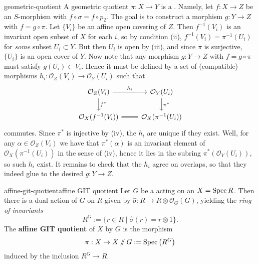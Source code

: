 \begin{example}{geometric-quotient}
    A geometric quotient $\pi : X \to Y$ is a . Namely, let $f : X \to Z$ be an $S$-morphism with $f \circ \sigma = f \circ p_2$. The goal is to construct a morphism $g : Y \to Z$ with $f = g \circ \pi$. Let $\{ V_i \}$ be an affine open covering of $Z$. Then $f^{-1}(V_i)$ is an invariant open subset of $X$ for each $i$, so by condition (ii), $f^{-1}(V_i) = \pi^{-1}(U_i)$ for \textit{some} subset $U_i \subset Y$. But then $U_i$ is open by (iii), and since $\pi$ is surjective, $\{ U_i \}$ is an open cover of $Y$. Now note that any morphism $g : Y \to Z$ with $f = g \circ \pi$ must satisfy $g(U_i) \subset V_i$. Hence it must be defined by a set of (compatible) morphisms $h_i : \mathcal{O}_Z(V_i) \to \mathcal{O}_Y(U_i)$ such that
    \[ \begin{tikzcd} \mathcal{O}_Z(V_i) \arrow{r}{h_i} \arrow{d}{f^*} & \mathcal{O}_Y(U_i) \arrow{d}{\pi^*} \\ \mathcal{O}_X(f^{-1}(V_i)) \arrow[equal]{r} & \mathcal{O}_X(\pi^{-1}(U_i)) \end{tikzcd} \]
    commutes. Since $\pi^*$ is injective by (iv), the $h_i$ are unique if they exist. Well, for any $\alpha \in \mathcal{O}_Z(V_i)$ we have that $\pi^*(\alpha)$ is an invariant element of $\mathcal{O}_X(\pi^{-1}(U_i))$ in the sense of (iv), hence it lies in the subring $\pi^*(\mathcal{O}_Y(U_i))$, so such $h_i$ exist.
    It remains to check that the $h_i$ agree on overlaps, so that they indeed glue to the desired $g : Y \to Z$.
\end{example}

\begin{topic}{affine-git-quotient}{affine GIT quotient}
    Let $G$ be a   acting on an  $X = \operatorname{Spec} R$. Then there is a dual action of $G$ on $R$ given by $\widehat{\sigma} : R \to R \otimes \mathcal{O}_G(G)$, yielding the \textit{ring of invariants}
    \[ R^G := \{ r \in R \mid \widehat{\sigma}(r) = r \otimes 1 \} . \]
    The \textbf{affine GIT quotient} of $X$ by $G$ is the morphism
    \[ \pi : X \to X \sslash G := \operatorname{Spec}\left(R^G\right) \]
    induced by the inclusion $R^G \to R$.
\end{topic}


